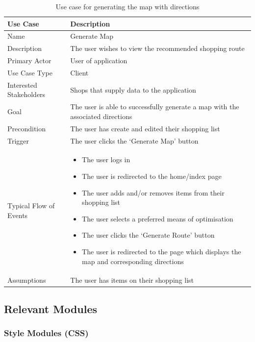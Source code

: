 \documentclass[10pt,twocolumn]{witseiepaper}
\begin{document}
		\begin{table}[htbp]
			\centering
			\caption{Use case for generating the map with directions}
			\label{uc:map}
			\begin{tabular}{|p{}|p{}|}
				\hline
				\textbf{Use Case} & \textbf{Description} \\ \hline
				Name & Generate Map \\ \hline
				Description & The user wishes to view the recommended shopping route \\ \hline
				Primary Actor & User of application \\ \hline
				Use Case Type & Client \\ \hline
				Interested Stakeholders & Shops that supply data to the application \\ \hline
				Goal & The user is able to successfully generate a map with the associated directions \\ \hline
				Precondition & The user has create and edited their shopping list \\ \hline
				Trigger & The user clicks the `Generate Map' button \\ \hline
				Typical Flow of Events & 
				\begin{itemize}
					\item The user logs in
					\item The user is redirected to the home/index page
					\item The user adds and/or removes items from their shopping list
					\item The user selects a preferred means of optimisation
					\item The user clicks the `Generate Route' button
					\item The user is redirected to the page which displays the map and corresponding directions
				\end{itemize}
				\\ \hline
				Assumptions & The user has items on their shopping list \\
				\hline
			\end{tabular}
		\end{table}
	\clearpage
	\subsection{Relevant Modules}
		
		\subsubsection{Style Modules (CSS)}
		
\end{document}
